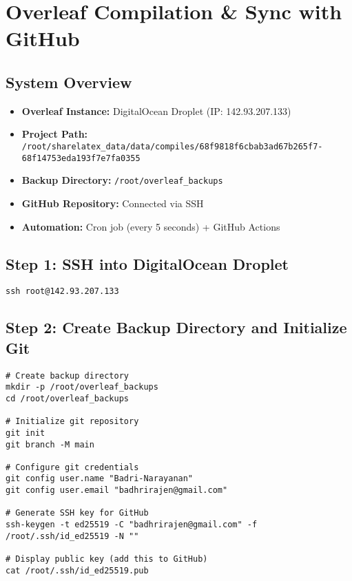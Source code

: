 \chapter{Overleaf Compilation & Sync with GitHub}
\label{chap:overleafCI}

\section{System Overview}

\begin{itemize}
    \item \textbf{Overleaf Instance:} DigitalOcean Droplet (IP: 142.93.207.133)
    \item \textbf{Project Path:} \texttt{/root/sharelatex\_data/data/compiles/68f9818f6cbab3ad67b265f7-68f14753eda193f7e7fa0355}
    \item \textbf{Backup Directory:} \texttt{/root/overleaf\_backups}
    \item \textbf{GitHub Repository:} Connected via SSH
    \item \textbf{Automation:} Cron job (every 5 seconds) + GitHub Actions
\end{itemize}

\section{Step 1: SSH into DigitalOcean Droplet}

\begin{verbatim}
ssh root@142.93.207.133
\end{verbatim}

\section{Step 2: Create Backup Directory and Initialize Git}

\begin{verbatim}
# Create backup directory
mkdir -p /root/overleaf_backups
cd /root/overleaf_backups

# Initialize git repository
git init
git branch -M main

# Configure git credentials
git config user.name "Badri-Narayanan"
git config user.email "badhrirajen@gmail.com"

# Generate SSH key for GitHub
ssh-keygen -t ed25519 -C "badhrirajen@gmail.com" -f /root/.ssh/id_ed25519 -N ""

# Display public key (add this to GitHub)
cat /root/.ssh/id_ed25519.pub
\end{verbatim}

